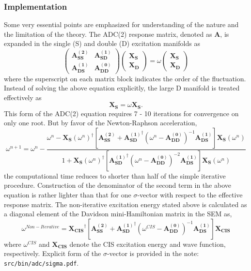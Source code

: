 \subsubsection{Implementation}
Some very essential points are emphasized for understanding of the nature and the limitation of  the theory. The ADC(2) response matrix, denoted as $\mathbf{A}$, is expanded in the single (S) and double (D) excitation manifolds as 
\begin{equation*}
\begin{pmatrix}
\mathbf{A_{SS}^{(2)}} & \mathbf{A_{SD}^{(1)}}\\
\mathbf{A_{DS}^{(1)}} & \mathbf{A_{DD}^{(0)}}
\end{pmatrix}
\begin{pmatrix}
\mathbf{X_S}\\
\mathbf{X_D}
\end{pmatrix}
=\omega
\begin{pmatrix}
\mathbf{X_S}\\
\mathbf{X_D}
\end{pmatrix}
\end{equation*}
where the superscript on each matrix block indicates the order of the fluctuation. Instead of solving the above equation explicitly, the large D manifold is treated effectively as
\begin{equation*}
[\mathbf{A_{SS}^{(2)}}+\mathbf{A_{SD}^{(1)}}^{\dagger}(\omega-\mathbf{A_{DD}^{(0)}})^{-1}\mathbf{A_{DS}^{(1)}}]\mathbf{X_{S}}=\omega\mathbf{X_{S}}.
\end{equation*}
This form of the ADC(2) equation requires 7 - 10 iterations for convergence on only one root. But by favor of the Newton-Raphson acceleration, 
\begin{equation*}
\omega^{n+1}=\omega^{n}-\frac{\omega^n-\mathbf{X_{S}}(\omega^n)^{\dagger}[\mathbf{A_{SS}^{(2)}}+\mathbf{A_{SD}^{(1)}}^{\dagger}(\omega^n-\mathbf{A_{DD}^{(0)}})^{-1}\mathbf{A_{DS}^{(1)}}]\mathbf{X_{S}}(\omega^n)}{1+\mathbf{X_{S}}(\omega^n)^{\dagger}[\mathbf{A_{SD}^{(1)}}^{\dagger}(\omega^n-\mathbf{A_{DD}^{(0)}})^{-2}\mathbf{A_{DS}^{(1)}}]\mathbf{X_{S}}(\omega^n)}
\end{equation*}
the computational time reduces to shorter than half of the simple iterative procedure. Construction of the denominator of the second term in the above equation is rather lighter than that for one $\sigma$-vector with respect to the effective response matrix. The non-iterative excitation energy stated above is calculated as a diagonal element of the Davidson mini-Hamiltonian matrix in the SEM as,
\begin{equation*}
\omega^{Non-Iterative}=\mathbf{X_{CIS}}^{\dagger}[\mathbf{A_{SS}^{(2)}}+\mathbf{A_{SD}^{(1)}}^{\dagger}(\omega^{CIS}-\mathbf{A_{DD}^{(0)}})^{-1}\mathbf{A_{DS}^{(1)}}]\mathbf{X_{CIS}}
\end{equation*}
where $\omega^{CIS}$ and $\mathbf{X_{CIS}}$ denote the CIS excitation energy and wave function, respectively. Explicit form of the $\sigma$-vector is provided in the note: \verb|src/bin/adc/sigma.pdf|. 

